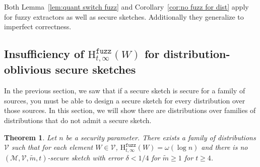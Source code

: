 \documentclass[11pt]{article}
\newcommand{\corref}[1]{\mbox{Corollary~\ref{#1}}}
\newcommand{\lemref}[1]{\mbox{Lemma~\ref{#1}}}
\newcommand{\Hfuzz}{\mathrm{H}^{\mathtt{fuzz}}_{t,\infty}}
\newtheorem{theorem}{Theorem}[section]
\begin{document}


Both \lemref{lem:quant switch fuzz} and \corref{cor:no fuzz for dist} apply for fuzzy extractors as well as secure sketches.  Additionally they generalize to imperfect correctness.

\subsection{Insufficiency of $\Hfuzz(W)$ for distribution-oblivious secure sketches}
In the previous section, we saw that if a secure sketch is secure for a family of sources, you must be able to design a secure sketch for every distribution over those sources.  In this section, we will show there are distributions over families of distributions that do not admit a secure sketch.

\begin{theorem}
\label{thm:imposs sketch}
Let $n$ be a security parameter.  There exists a family of distributions $\mathcal{V}$ such that for each element $W\in \mathcal{V}$, $\Hfuzz(W)= \omega(\log n)$ and there is no $(\mathcal{M}, \mathcal{V}, \tilde{m}, t)$-secure sketch with error $\delta < 1/4$ for $\tilde{m} \ge 1$ for $t\ge 4$.  
\end{theorem}
\end{document}
